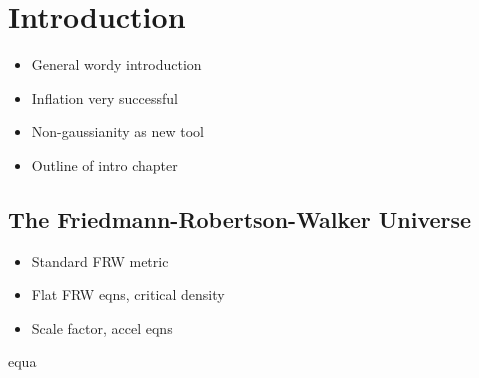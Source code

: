 \renewcommand{\CVSrevision}{\version$Id: mainintro.tex,v 1.13 2009/08/17 21:38:12 ith Exp $}

\chapter{Introduction}
\label{ch:introduction}
\begin{itemize}
 \item General wordy introduction
 \item Inflation very successful
 \item Non-gaussianity as new tool
 \item Outline of intro chapter
\end{itemize}

\section{The Friedmann-Robertson-Walker Universe}
\label{sec:frw-intro}
\begin{itemize}
 \item Standard FRW metric
 \item Flat FRW eqns, critical density
 \item Scale factor, accel eqns
\end{itemize}

equa

